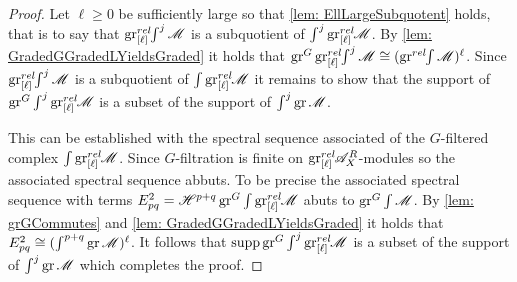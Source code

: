 \begin{proof}
  Let $\ell\geq 0$ be sufficiently large so that \cref{lem: EllLargeSubquotent} holds, that is to say that $\grl\int^j \M$ is a subquotient of $\int^j \grl \M$.
  By \cref{lem: GradedGGradedLYieldsGraded} it holds that $\gr^G\grl \int^j \M \cong (\grrel\int\M)^\ell$.
  Since $\grl \int^j \M$ is a subquotient of $\int \grl\M$ it remains to show that the support of $\gr^G \int^j \grl\M$ is a subset of the support of $\int^j \gr \M$.

  This can be established with the spectral sequence associated of the $G$-filtered complex $\int \grl \M$. Since $G$-filtration is finite on $\grl\A_X^R$-modules so the associated spectral sequence abbuts. To be precise the associated spectral sequence with terms
  $E^2_{pq} = \H^{p+q}\gr^G \int \grl \M$ abuts to $\gr^G\int \M$.
  By \cref{lem: grGCommutes} and \cref{lem: GradedGGradedLYieldsGraded} it holds that $E^2_{pq} \cong (\int^{p+q}\gr \M)^\ell$. 
  It follows that $\op{supp}\gr^G \int^j \grl\M$ is a subset of the support of $\int^j \gr \M$ which completes the proof.
\end{proof}
\listoftodos
